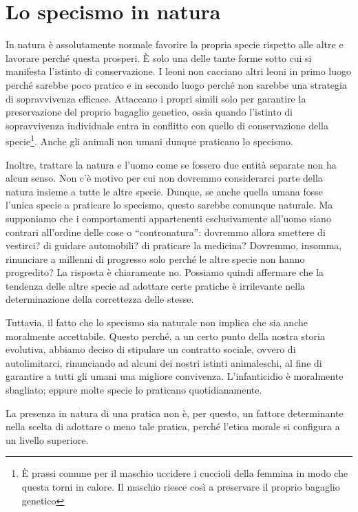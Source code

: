 \documentclass[a4paper,11pt,oneside,article]{memoir}
\begin{document}
\chapter{Lo specismo in natura}

In natura è assolutamente normale favorire la propria specie rispetto alle altre
e lavorare perché questa prosperi. È solo una delle tante forme sotto cui si
manifesta l'istinto di conservazione. I leoni non cacciano altri leoni in primo
luogo perché sarebbe poco pratico e in secondo luogo perché non sarebbe una
strategia di sopravvivenza efficace. Attaccano i propri simili solo per
garantire la preservazione del proprio bagaglio genetico, ossia quando l'istinto
di sopravvivenza individuale entra in conflitto con quello di conservazione
della specie\footnote{È prassi comune per il maschio uccidere i cuccioli della
femmina in modo che questa torni in calore. Il maschio riesce così a preservare
il proprio bagaglio genetico}. Anche gli animali non umani dunque praticano lo
specismo.

Inoltre, trattare la natura e l'uomo come se fossero due entità separate non ha
alcun senso. Non c'è motivo per cui non dovremmo considerarci parte della natura
insieme a tutte le altre specie. Dunque, se anche quella umana fosse l'unica
specie a praticare lo specismo, questo sarebbe comunque naturale. Ma supponiamo
che i comportamenti appartenenti esclusivamente all'uomo siano contrari
all'ordine delle cose o ``contronatura'': dovremmo allora smettere di vestirci?
di guidare automobili? di praticare la medicina? Dovremmo, insomma, rinunciare a
millenni di progresso solo perché le altre specie non hanno progredito? La
risposta è chiaramente no. Possiamo quindi affermare che la tendenza delle altre
specie ad adottare certe pratiche è irrilevante nella determinazione della
correttezza delle stesse.

Tuttavia, il fatto che lo specismo sia naturale non implica che sia anche
moralmente accettabile. Questo perché, a un certo punto della nostra storia
evolutiva, abbiamo deciso di stipulare un contratto sociale, ovvero di
autolimitarci, rinunciando ad alcuni dei nostri istinti animaleschi, al fine di
garantire a tutti gli umani una migliore convivenza. L'infanticidio è moralmente
sbagliato; eppure molte specie lo praticano quotidianamente.

La presenza in natura di una pratica non è, per questo, un fattore determinante
nella scelta di adottare o meno tale pratica, perché l'etica morale si configura
a un livello superiore.
\end{document}
